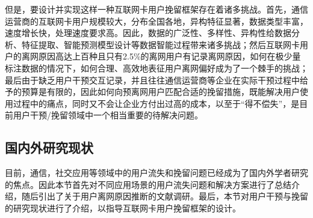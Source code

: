 但是，要设计并实现这样一种互联网卡用户挽留框架存在着诸多挑战。首先，通信运营商的互联网卡用户规模较大，分布全国各地，异构特征显著，数据类型丰富，速度增长快，处理速度要求高。因此，数据的广泛性、多样性、异构性给数据分析、特征提取、智能预测模型设计等数据智能过程带来诸多挑战；然后互联网卡用户的离网原因高达上百种且只有2.5\%的离网用户有记录离网原因，如何在极少量标注数据的情况下，如何合理、高效地表征用户离网偏好成为了一个棘手的挑战；最后由于缺乏用户干预交互记录，并且往往通信运营商等企业在实际干预过程中给予的预算是有限的，因此如何向预离网用户匹配合适的挽留措施，既能解决用户使用过程中的痛点，同时又不会让企业方付出过高的成本，以至于“得不偿失”，是目前用户干预/挽留领域中一个相当重要的待解决问题。


\par


\subsection{国内外研究现状}
目前，通信，社交应用等领域中的用户流失和挽留问题已经成为了国内外学者研究的焦点。因此本节首先对不同应用场景的用户流失问题和解决方案进行了总结介绍，随后引出了关于用户离网原因推断的文献调研。最后，本节对用户干预与挽留的研究现状进行了介绍，以指导互联网卡用户挽留框架的设计。
